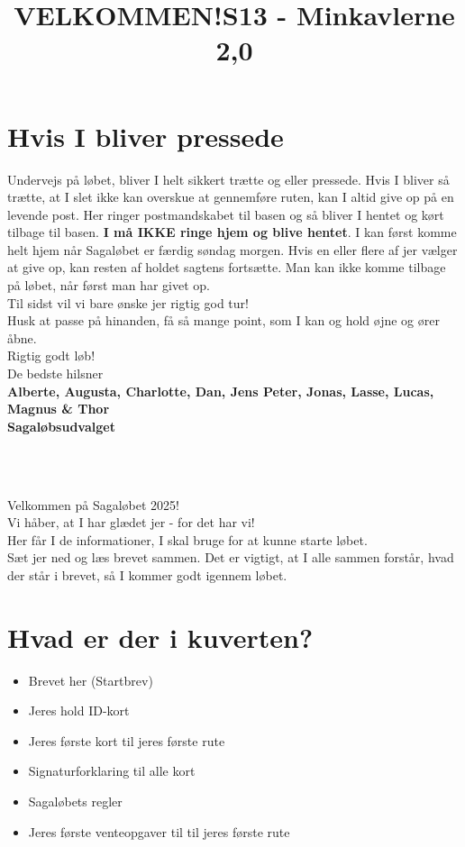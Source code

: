 \section{Hvis I bliver pressede}
Undervejs på løbet, bliver I helt sikkert trætte og eller pressede. Hvis I bliver så trætte, at I slet ikke kan overskue at gennemføre ruten, kan I altid give op på en levende post. Her ringer postmandskabet til basen og så bliver I hentet og kørt tilbage til basen. \textbf{I må IKKE ringe hjem og blive hentet}. I kan først komme helt hjem når Sagaløbet er færdig søndag morgen. Hvis en eller flere af jer vælger at give op, kan resten af holdet sagtens fortsætte. Man kan ikke komme tilbage på løbet, når først man har givet op.\\
\newline
Til sidst vil vi bare ønske jer rigtig god tur!\\
Husk at passe på hinanden, få så mange point, som I kan og hold øjne og ører åbne.\\
\newline
Rigtig godt løb!\\
\newline
\textcolor{søblå}{De bedste hilsner}\\
\textcolor{natblå}{\textbf{Alberte, Augusta, Charlotte, Dan, Jens Peter, Jonas, Lasse, Lucas, Magnus \& Thor}}\\
\textcolor{natblå}{\textbf{Sagaløbsudvalget}}\\
\newpage
\title{VELKOMMEN!}\\
\newline
\title{\textcolor{flammefarvet}{S13 - Minkavlerne 2,0 }}\\
\newline
Velkommen på Sagaløbet 2025!\\
Vi håber, at I har glædet jer - for det har vi!\\
Her får I de informationer, I skal bruge for at kunne starte løbet.\\
Sæt jer ned og læs brevet sammen. Det er vigtigt, at I alle sammen forstår, hvad der står i brevet, så I kommer godt igennem løbet.
\section{Hvad er der i kuverten?}
\begin{itemize}
    \item Brevet her (Startbrev)
    \item Jeres hold ID-kort
    \item Jeres første kort til jeres første rute
    \item Signaturforklaring til alle kort
    \item Sagaløbets regler
    \item Jeres første venteopgaver til til jeres første rute
\end{itemize}
